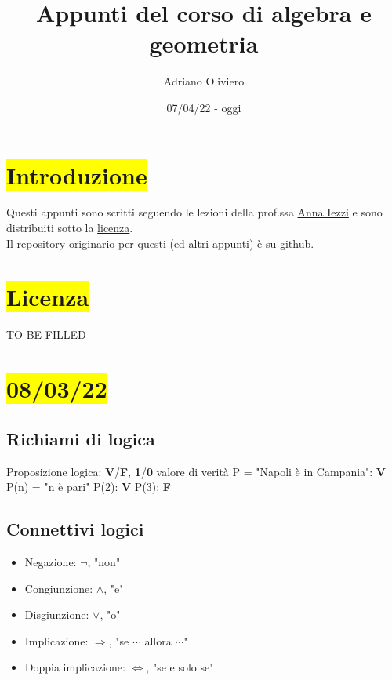 \documentclass{article}
\title{Appunti del corso di algebra e geometria}
\author{Adriano Oliviero}
\date{07/04/22 - oggi}
\begin{document}
\newcommand{\hl}[1]{\colorbox{yellow}{#1}}
\newcommand{\ul}[1]{\underline{#1}}
\newcommand{\Def}[2]{\paragraph{\ul{Def}:}#1\\\hspace*{3em}\begin{minipage}{.8\textwidth}#2\end{minipage}}
\newcommand{\Esempio}[1]{\subsubsection*{\ul{Esempio}:}#1}
\newcommand{\R}{\mathbb{R}}
\newcommand{\K}{\mathbb{K}}
\newcommand{\M}{\mathcal{M}}
\maketitle
\section*{\hl{Introduzione}}
Questi appunti sono scritti seguendo le lezioni della prof.ssa \href{https://aiezzi.it/}{Anna Iezzi} e sono distribuiti sotto la \hyperref[sec:Licenza]{licenza}.\\
Il repository originario per questi (ed altri appunti) è su \href{https://github.com/TheDarkBug/notes}{github}.

\section*{\hl{Licenza}}
\label{sec:Licenza}
TO BE FILLED
\section{\hl{08/03/22}}
\subsection*{Richiami di logica}
Proposizione logica: \textbf{V}/\textbf{F}, \textbf{1}/\textbf{0} valore di verità
P = "Napoli è in Campania": \textbf{V}
P(n) = "n è pari"
P(2): \textbf{V}
P(3): \textbf{F}
\subsection*{Connettivi logici}
\begin{itemize}
	\item Negazione: $\neg$, "non"
	\item Congiunzione: $\wedge$, "e"
	\item Disgiunzione: $\vee$, "o"
	\item Implicazione: $\Rightarrow$, "se $\cdots$ allora $\cdots$"
	\item Doppia implicazione: $\Leftrightarrow$, "se e solo se"
\end{itemize}
\end{document}
